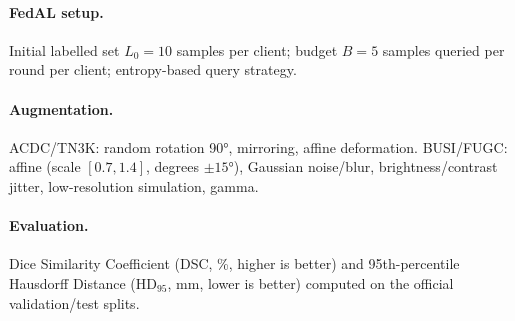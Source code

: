 \paragraph{FedAL setup.}
Initial labelled set $L_0 = 10$ samples per client;
budget $B = 5$ samples queried per round per client;
entropy-based query strategy.

\paragraph{Augmentation.}
ACDC/TN3K: random rotation 90°, mirroring, affine deformation.
BUSI/FUGC: affine (scale $[0.7,1.4]$, degrees $\pm15°$), Gaussian
noise/blur, brightness/contrast jitter, low-resolution simulation, gamma.

\paragraph{Evaluation.}
Dice Similarity Coefficient (DSC, \%, higher is better) and
95th-percentile Hausdorff Distance (HD$_{95}$, mm, lower is better)
computed on the official validation/test splits.
